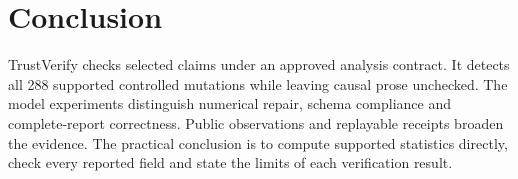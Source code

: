 \section{Conclusion}
TrustVerify checks selected claims under an approved analysis contract. It detects all 288 supported controlled mutations while leaving causal prose unchecked. The model experiments distinguish numerical repair, schema compliance and complete-report correctness. Public observations and replayable receipts broaden the evidence. The practical conclusion is to compute supported statistics directly, check every reported field and state the limits of each verification result.

\FloatBarrier
\clearpage
{}
\begingroup{}


\endgroup

